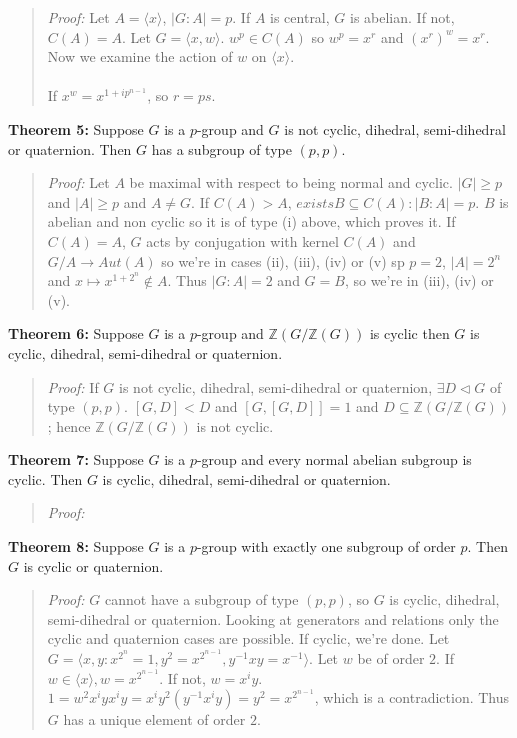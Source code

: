 \begin{quote}
\emph{Proof:}
Let $A= \langle x \rangle$, $|G:A| = p$.  If $A$ is central, $G$ is abelian.  If not, $C(A)=A$.  Let
$G = \langle x, w \rangle$.  $w^p \in C(A)$ so $w^p = x^r$ and $(x^r)^w = x^r$.  Now we examine the
action of $w$ on $\langle x \rangle$.\\
\\
If $x^w = x^{1+ip^{n-1}}$, so $r = ps$.
\end{quote}
{\bf Theorem 5:} Suppose $G$ is a $p$-group and $G$ is not cyclic, dihedral, semi-dihedral or quaternion.  Then
$G$ has a subgroup of type $(p,p)$.
\begin{quote}
\emph{Proof:}  Let $A$ be maximal with respect to being normal and cyclic. $|G| \geq p$ and $|A| \geq p$
and $A \ne G$.  If $C(A) > A$, $exists B \subseteq C(A): |B:A| = p$.  $B$ is abelian and non cyclic so it is
of type (i) above, which proves it.  If $C(A)=A$, $G$ acts by conjugation with kernel $C(A)$ and
$G/A \rightarrow Aut(A)$ so we're in cases (ii), (iii), (iv) or (v) sp $p=2$, $|A|=2^n$ and
$x \mapsto x^{1+2^n} \notin A$.   Thus $|G:A|=2$ and $G=B$, so we're in (iii), (iv) or (v).
\end{quote}
{\bf Theorem 6:} Suppose $G$ is a $p$-group and ${\mathbb Z}(G/{\mathbb Z}(G))$ is cyclic then $G$ is cyclic,
dihedral, semi-dihedral or quaternion.
\begin{quote}
\emph{Proof:}
If $G$ is not cyclic,
dihedral, semi-dihedral or quaternion, $\exists D \lhd G$ of type $(p,p)$. $[G,D] < D$ and $[G,[G,D]] = 1$ and
$ D \subseteq {\mathbb Z}(G/{\mathbb Z}(G))$;
hence ${\mathbb Z}(G/{\mathbb Z}(G))$ is not cyclic.
\end{quote}
{\bf Theorem 7:} Suppose $G$ is a $p$-group and every normal abelian subgroup is cyclic.  Then $G$ is cyclic,
dihedral, semi-dihedral or quaternion.
\begin{quote}
\emph{Proof:}
\end{quote}
{\bf Theorem 8:} Suppose $G$ is a $p$-group with exactly one subgroup of order $p$. Then $G$ is cyclic or quaternion.
\begin{quote}
\emph{Proof:}
$G$ cannot have a subgroup of type $(p,p)$, so $G$ is cyclic, dihedral, semi-dihedral or quaternion.
Looking at generators and relations only the cyclic and quaternion cases are possible.  If cyclic, we're done.
Let $G = \langle x,y: x^{2^n} =1, y^2 = x^{2^{n-1}}, y^{-1}xy = x^{-1} \rangle$.  Let $w$ be of order $2$.
If $w \in \langle x \rangle, w = x^{2^{n-1}}$.  If not, $w= x^iy$.
$1 = w^2 x^i y x^i y = x^i y^2 (y^{-1}x^i y)= y^2 = x^{2^{n-1}}$, which is a contradiction.  Thus $G$ has a
unique element of order $2$.
\end{quote}
